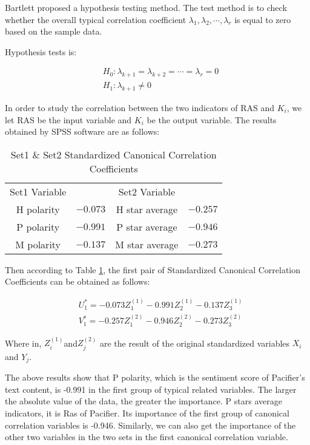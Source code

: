 \documentclass{mcmthesis}
\begin{document}
Bartlett proposed a hypothesis testing method. The test method is to check whether the overall typical correlation coefficient \(\lambda_{1}, \lambda_{2}, \cdots, \lambda_{r}\) is equal to zero based on the sample data.

Hypothesis tests is:

\[\begin{aligned}
&H_{0}: \lambda_{k+1}=\lambda_{k+2}=\cdots=\lambda_{r}=0\\
&H_{1}: \lambda_{k+1} \neq 0
\end{aligned}\]

In order to study the correlation between the two indicators of RAS and \(K_{i}\), we let RAS be the input variable and \(K_{i}\) be the output variable. The results obtained by SPSS software are as follows:

\begin{table}[h]
	\centering
\caption{Set1 $\&$ Set2 Standardized Canonical Correlation Coefficients}\label{q4b1}

	\begin{tabular}{cccc}
		& & & \\
		\toprule Set1 Variable &  & Set2 Variable &  \\
		\midrule H polarity & $-0.073$ & H star average & $-0.257$ \\
		P polarity & $-0.991$ & P star average & $-0.946$ \\
		M polarity & $-0.137$ & M star average & $-0.273$ \\
		\bottomrule
	\end{tabular}
	
\end{table}



Then according to Table \ref{q4b1}, the first pair of Standardized Canonical Correlation Coefficients can be obtained as follows:

\[\begin{aligned}
&U_{1}^{*}=-0.073 Z_{1}^{(1)}-0.991 Z_{2}^{(1)}-0.137 Z_{3}^{(1)}\\
&V_{1}^{*}=-0.257 Z_{1}^{(2)}-0.946 Z_{2}^{(2)}-0.273 Z_{3}^{(2)}
\end{aligned}\]

Where in, \(Z_{i}^{(1)}\)and\(Z_{j}^{(2)}\) are the result of the original standardized variables \(X_{i}\) and \(Y_{j}\).

The above results show that P polarity, which is the sentiment score of Pacifier's text content, is -0.991 in the first group of typical related variables. The larger the absolute value of the data, the greater the importance. P stars average indicators, it is Ras of Pacifier. Its importance of the first group of canonical correlation variables is -0.946. Similarly, we can also get the importance of the other two variables in the two sets in the first canonical correlation variable.
\end{document}
